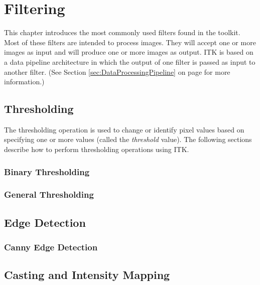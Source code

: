\chapter{Filtering}

This chapter introduces the most commonly used filters found in the toolkit.
Most of these filters are intended to process images. They will accept one or
more images as input and will produce one or more images as output. ITK is
based on a data pipeline architecture in which the output of one filter is
passed as input to another filter. (See Section
\ref{sec:DataProcessingPipeline} on page \pageref{sec:DataProcessingPipeline}
for more information.)


\section{Thresholding}
\ifitkFullVersion
\label{sec:ThresholdingFiltering}
\fi

The thresholding operation is used to change or identify pixel values based
on specifying one or more values (called the \emph{threshold} value). The
following sections describe how to perform thresholding operations using
ITK.

\subsection{Binary Thresholding}
\label{sec:BinaryThresholdingImageFilter}

\ifitkFullVersion

\fi

\subsection{General Thresholding}
\label{sec:ThresholdingImageFilter}

\ifitkFullVersion

\fi


\section{Edge Detection}

\subsection{Canny Edge Detection}
\ifitkFullVersion

\fi


\section{Casting and Intensity Mapping}
\label{sec:CastingImageFilters}

